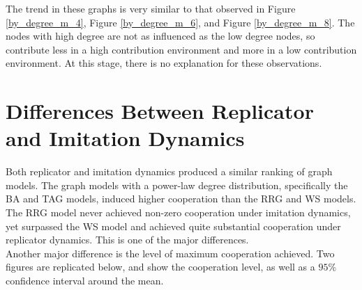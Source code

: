 The trend in these graphs is very similar to that observed in Figure \ref{by_degree_m_4}, Figure \ref{by_degree_m_6}, and Figure \ref{by_degree_m_8}. The nodes with high degree are not as influenced as the low degree nodes, so contribute less in a high contribution environment and more in a low contribution environment. At this stage, there is no explanation for these observations.

\section{Differences Between Replicator and Imitation Dynamics}

Both replicator and imitation dynamics produced a similar ranking of graph models. The graph models with a power-law degree distribution, specifically the BA and TAG models, induced higher cooperation than the RRG and WS models. The RRG model never achieved non-zero cooperation under imitation dynamics, yet surpassed the WS model and achieved quite substantial cooperation under replicator dynamics. This is one of the major differences. \\

Another major difference is the level of maximum cooperation achieved. Two figures are replicated below, and show the cooperation level, as well as a $95\%$ confidence interval around the mean. \\

